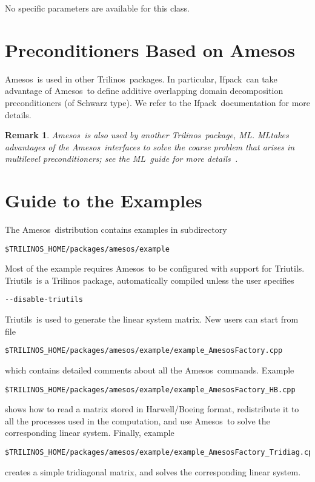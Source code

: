 \documentclass[11pt]{SANDreport}
\newcommand{\amesos}{{\sc Amesos}}
\newcommand{\ml}{{\sc ML}}
\newcommand{\ifpack}{{\sc Ifpack}}
\newcommand{\triutils}{{\sc Triutils}}
\newcommand{\trilinos}{{\sc Trilinos}}
\newtheorem{remark}{Remark}
\begin{document}
\smallskip

No specific parameters are available for this class.

\section{Preconditioners Based on \amesos}
\label{sec:prec}

\amesos\ is used in other \trilinos\ packages. In particular, \ifpack\
  can take advantage of \amesos\ to define additive overlapping domain
  decomposition preconditioners (of Schwarz type). We refer to the
  \ifpack\ documentation for more details.

\begin{remark}
\amesos\ is also used by another \trilinos\ package, \ml. \ml takes
advantages of the \amesos\ interfaces to solve the coarse problem
that arises in multilevel preconditioners; see the \ml\ guide for more
details~\cite{ml-guide}.
\end{remark}

\section{Guide to the Examples}
\label{sec:examples}

The \amesos\ distribution contains examples in subdirectory
\begin{verbatim}
$TRILINOS_HOME/packages/amesos/example
\end{verbatim}
Most of the example requires \amesos\ to be configured with support for
\triutils. \triutils\ is a Trilinos package, automatically compiled unless
the user specifies
\begin{verbatim}
--disable-triutils
\end{verbatim}
\triutils\ is used to generate the linear system matrix. New users can
start from file
\begin{verbatim}
$TRILINOS_HOME/packages/amesos/example/example_AmesosFactory.cpp
\end{verbatim}
which contains detailed comments about all the \amesos\ commands.
Example
\begin{verbatim}
$TRILINOS_HOME/packages/amesos/example/example_AmesosFactory_HB.cpp
\end{verbatim}
shows how to read a matrix stored in Harwell/Boeing format, redistribute it
to all the processes used in the computation, and use \amesos\ to solve the
corresponding linear system. Finally, example
\begin{verbatim}
$TRILINOS_HOME/packages/amesos/example/example_AmesosFactory_Tridiag.cpp
\end{verbatim}
creates a simple tridiagonal matrix, and solves the corresponding linear
system.



\end{document}
